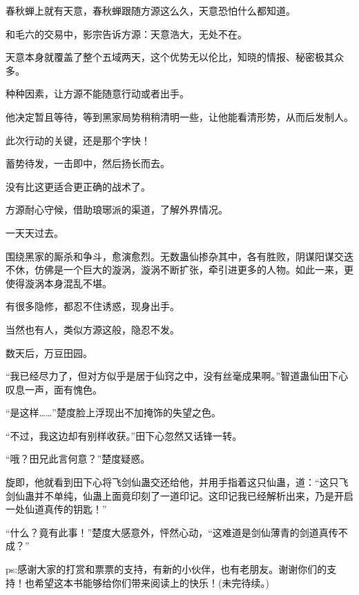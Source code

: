 \begin{this_body}
春秋蝉上就有天意，春秋蝉跟随方源这么久，天意恐怕什么都知道。

和毛六的交易中，影宗告诉方源：天意浩大，无处不在。

天意本身就覆盖了整个五域两天，这个优势无以伦比，知晓的情报、秘密极其众多。

种种因素，让方源不能随意行动或者出手。

他决定暂且等待，等到黑家局势稍稍清明一些，让他能看清形势，从而后发制人。

此次行动的关键，还是那个字快！

蓄势待发，一击即中，然后扬长而去。

没有比这更适合更正确的战术了。

方源耐心守候，借助琅琊派的渠道，了解外界情况。

一天天过去。

围绕黑家的厮杀和争斗，愈演愈烈。无数蛊仙掺杂其中，各有胜败，阴谋阳谋交迭不休，仿佛是一个巨大的漩涡，漩涡不断扩张，牵引进更多的人物。如此一来，更使得漩涡本身混乱不堪。

有很多隐修，都忍不住诱惑，现身出手。

当然也有人，类似方源这般，隐忍不发。

数天后，万豆田园。

“我已经尽力了，但对方似乎是居于仙窍之中，没有丝毫成果啊。”智道蛊仙田下心叹息一声，面有愧色。

“是这样……”楚度脸上浮现出不加掩饰的失望之色。

“不过，我这边却有别样收获。”田下心忽然又话锋一转。

“哦？田兄此言何意？”楚度疑惑。

旋即，他就看到田下心将飞剑仙蛊交还给他，并用手指着这只仙蛊，道：“这只飞剑仙蛊并不单纯，仙蛊上面竟印刻了一道印记。这印记我已经解析出来，乃是开启一处仙道真传的钥匙！”

“什么？竟有此事！”楚度大感意外，怦然心动，“这难道是剑仙薄青的剑道真传不成？”

ps:感谢大家的打赏和票票的支持，有新的小伙伴，也有老朋友。谢谢你们的支持！也希望这本书能够给你们带来阅读上的快乐！(未完待续。)

\end{this_body}

